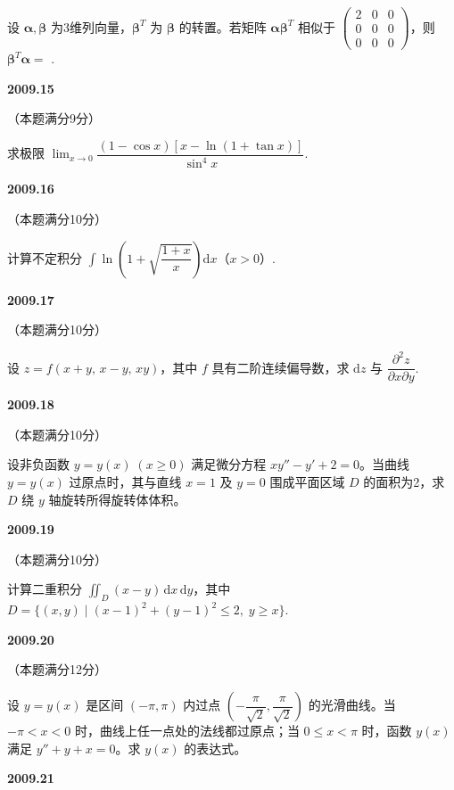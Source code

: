 \documentclass[UTF8,12pt,fontset=windows]{ctexart}
\begin{document}
设 $\boldsymbol{\alpha}, \boldsymbol{\beta}$ 为3维列向量，$\boldsymbol{\beta}^T$ 为 $\boldsymbol{\beta}$ 的转置。若矩阵 $\boldsymbol{\alpha}\boldsymbol{\beta}^T$ 相似于 $\begin{pmatrix} 2 & 0 & 0 \\ 0 & 0 & 0 \\ 0 & 0 & 0 \end{pmatrix}$，则 $\boldsymbol{\beta}^T\boldsymbol{\alpha} =$ \underline{\hspace{20mm}}.

\vfill
\newpage
{\large\bfseries 2009.15}

（本题满分9分）

求极限 $\lim_{x \to 0} \dfrac{(1 - \cos x)[x - \ln(1 + \tan x)]}{\sin^4 x}$.

\vfill
\newpage
{\large\bfseries 2009.16}

（本题满分10分）

计算不定积分 $\int \ln\left(1 + \sqrt{\dfrac{1+x}{x}}\right)\mathrm{d}x$（$x > 0$）.

\vfill
\newpage
{\large\bfseries 2009.17}

（本题满分10分）

设 $z = f(x+y, \, x-y, \, xy)$，其中 $f$ 具有二阶连续偏导数，求 $\mathrm{d}z$ 与 $\dfrac{\partial^2 z}{\partial x \partial y}$.

\vfill
\newpage
{\large\bfseries 2009.18}

（本题满分10分）

设非负函数 $y = y(x) \; (x \geqslant 0)$ 满足微分方程 $xy'' - y' + 2 = 0$。当曲线 $y = y(x)$ 过原点时，其与直线 $x = 1$ 及 $y = 0$ 围成平面区域 $D$ 的面积为2，求 $D$ 绕 $y$ 轴旋转所得旋转体体积。

\vfill
\newpage
{\large\bfseries 2009.19}

（本题满分10分）

计算二重积分 $\iint_D (x - y) \,\mathrm{d}x\,\mathrm{d}y$，其中 $D = \{(x, y) \mid (x-1)^2 + (y-1)^2 \leqslant 2, \; y \geqslant x\}$.

\vfill
\newpage
{\large\bfseries 2009.20}

（本题满分12分）

设 $y = y(x)$ 是区间 $(-\pi, \pi)$ 内过点 $\left(-\dfrac{\pi}{\sqrt{2}}, \dfrac{\pi}{\sqrt{2}}\right)$ 的光滑曲线。当 $-\pi < x < 0$ 时，曲线上任一点处的法线都过原点；当 $0 \leqslant x < \pi$ 时，函数 $y(x)$ 满足 $y'' + y + x = 0$。求 $y(x)$ 的表达式。

\vfill
\newpage
{\large\bfseries 2009.21}
\end{document}
